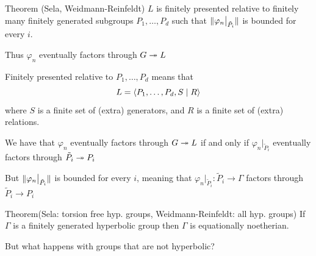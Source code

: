 \documentclass[handout]{beamer}[10]
\begin{document}

\begin{frame}
    \begin{block}{Theorem (Sela, Weidmann-Reinfeldt)}
        $L$ is finitely presented relative to finitely many finitely generated subgroups $P_1, \ldots, P_d$ such that $\lVert \varphi_{n}\big\vert_{\tilde{P}_i} \rVert$ is bounded for every $i$.

        Thus $\varphi_n$ eventually factors through $G \twoheadrightarrow L$
    \end{block}

    Finitely presented relative to $P_1, \ldots, P_d$ means that
    \begin{equation*}
        L = \left<  P_1, \ldots, P_d, S \mid R \right> 
    \end{equation*}
    where $S$ is a finite set of (extra) generators, and $R$ is a finite set of (extra) relations.

    \pause We have that $\varphi_n$ eventually factors through $G\twoheadrightarrow L$ if and only if $\varphi_{n}\big\vert_{\tilde{P}_i}$ eventually factors through $\tilde{P}_i \twoheadrightarrow P_i$

    
    \pause But $\lVert \varphi_{n}\big\vert_{\tilde{P}_i} \rVert$ is bounded for every $i$, meaning that $\varphi_{n}\big\vert_{\tilde{P}_i} : \tilde{P}_i \to \Gamma$ factors through $\tilde{P}_i\to P_i$

\end{frame}

\begin{frame}
    \begin{block}{Theorem(Sela: torsion free hyp. groups, Weidmann-Reinfeldt: all hyp. groups)}
        If $\Gamma$ is a finitely generated hyperbolic group then $\Gamma$ is equationally noetherian.
    \end{block}
    \vspace*{4ex}
    But what happens with groups that are not hyperbolic?
\end{frame}
\end{document}
